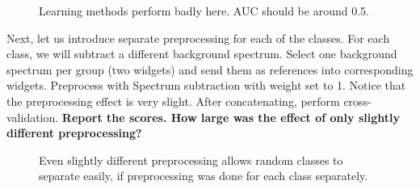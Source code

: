 \begin{center}
\end{center}
\begin{figure}[h]
\centering
\vspace{-0.5cm}
\caption{Learning methods perform badly here. AUC should be around 0.5.}
\end{figure}

Next, let us introduce separate preprocessing for each of the classes. For each class, we will subtract a different background spectrum. Select one background spectrum per group (two  widgets) and send them as references into corresponding  widgets. Preprocess with Spectrum subtraction with weight set to 1. Notice that the preprocessing effect is very slight. After concatenating, perform cross-validation. \textbf{Report the scores. How large was the effect of only slightly different preprocessing?}

\begin{center}
\end{center}
\begin{figure}[h]
\centering
\vspace{-0.5cm}
\caption{Even slightly different preprocessing allows random classes to separate easily, if preprocessing was done for each class separately.}
\end{figure}

